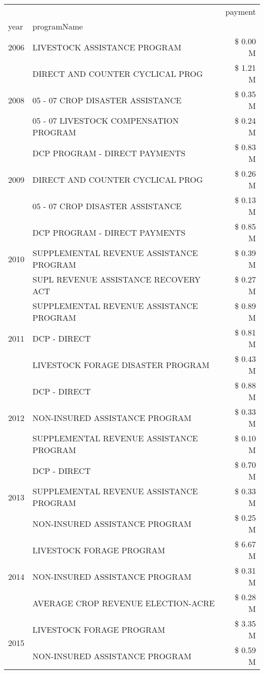 \begin{tabular}{llr}
\toprule
 &  & payment \\
year & programName &  \\
\midrule
2006 & LIVESTOCK ASSISTANCE PROGRAM & \$ 0.00 M \\
\cline{1-3}
\multirow[t]{3}{*}{2008} & DIRECT AND COUNTER CYCLICAL PROG & \$ 1.21 M \\
 & 05 - 07 CROP DISASTER ASSISTANCE & \$ 0.35 M \\
 & 05 - 07 LIVESTOCK COMPENSATION PROGRAM & \$ 0.24 M \\
\cline{1-3}
\multirow[t]{3}{*}{2009} & DCP PROGRAM - DIRECT PAYMENTS & \$ 0.83 M \\
 & DIRECT AND COUNTER CYCLICAL PROG & \$ 0.26 M \\
 & 05 - 07 CROP DISASTER ASSISTANCE & \$ 0.13 M \\
\cline{1-3}
\multirow[t]{3}{*}{2010} & DCP PROGRAM - DIRECT PAYMENTS & \$ 0.85 M \\
 & SUPPLEMENTAL REVENUE ASSISTANCE PROGRAM & \$ 0.39 M \\
 & SUPL REVENUE ASSISTANCE RECOVERY ACT & \$ 0.27 M \\
\cline{1-3}
\multirow[t]{3}{*}{2011} & SUPPLEMENTAL REVENUE ASSISTANCE PROGRAM & \$ 0.89 M \\
 & DCP - DIRECT & \$ 0.81 M \\
 & LIVESTOCK FORAGE DISASTER PROGRAM & \$ 0.43 M \\
\cline{1-3}
\multirow[t]{3}{*}{2012} & DCP - DIRECT & \$ 0.88 M \\
 & NON-INSURED ASSISTANCE PROGRAM & \$ 0.33 M \\
 & SUPPLEMENTAL REVENUE ASSISTANCE PROGRAM & \$ 0.10 M \\
\cline{1-3}
\multirow[t]{3}{*}{2013} & DCP - DIRECT & \$ 0.70 M \\
 & SUPPLEMENTAL REVENUE ASSISTANCE PROGRAM & \$ 0.33 M \\
 & NON-INSURED ASSISTANCE PROGRAM & \$ 0.25 M \\
\cline{1-3}
\multirow[t]{3}{*}{2014} & LIVESTOCK FORAGE PROGRAM & \$ 6.67 M \\
 & NON-INSURED ASSISTANCE PROGRAM & \$ 0.31 M \\
 & AVERAGE CROP REVENUE ELECTION-ACRE & \$ 0.28 M \\
\cline{1-3}
\multirow[t]{3}{*}{2015} & LIVESTOCK FORAGE PROGRAM & \$ 3.35 M \\
 & NON-INSURED ASSISTANCE PROGRAM & \$ 0.59 M \\

\end{tabular}
